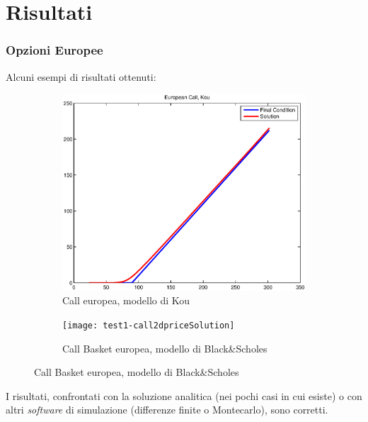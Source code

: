 \documentclass{beamer}
\begin{document}
\section{Risultati}


\begin{frame}
 \frametitle{Opzioni Europee}
Alcuni esempi di risultati ottenuti: 
\begin{figure}
 \begin{subfigure}{0.48\linewidth}
 \centering
 \includegraphics[width=.9\linewidth]{test2-call1dkou}
 \caption{Call europea, modello di Kou}
 \end{subfigure}
 \hfill
 \begin{subfigure}{0.48\linewidth}
  \centering
  \texttt{[image: test1-call2dpriceSolution]}
  \caption{Call Basket europea, modello di Black\&Scholes}
 \end{subfigure}
 \end{figure}
I risultati, confrontati con la soluzione analitica (nei pochi casi in cui esiste) o con altri \emph{software} di simulazione (differenze finite o Montecarlo), sono corretti.
\end{frame}
\end{document}
